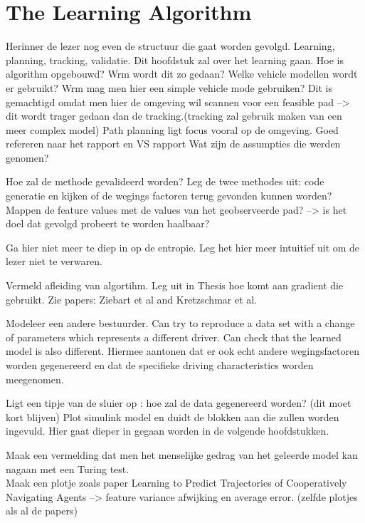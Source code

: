 \chapter{The Learning Algorithm\\}
\label{cha:2}
Herinner de lezer nog even de structuur die gaat worden gevolgd. 
Learning, planning, tracking, validatie.
Dit hoofdstuk zal over het learning gaan.
Hoe is algorithm opgebouwd? Wrm wordt dit zo gedaan?
Welke vehicle modellen wordt er gebruikt? Wrm mag men hier een simple vehicle mode gebruiken?
Dit is gemachtigd omdat men hier de omgeving wil scannen voor een feasible pad --> dit wordt trager gedaan dan de tracking.(tracking zal gebruik maken van een meer complex model) Path planning ligt focus vooral op de omgeving.
Goed refereren naar het rapport en VS rapport
Wat zijn de assumpties die werden genomen?

Hoe zal de methode gevalideerd worden? Leg de twee methodes uit: code generatie en kijken of de wegings factoren terug gevonden kunnen worden? Mappen de feature values met de values van het geobserveerde pad? --> is het doel dat gevolgd probeert te worden haalbaar? 

Ga hier niet meer te diep in op de entropie. Leg het hier meer intuitief uit om de lezer niet te verwaren. 

Vermeld afleiding van algortihm. Leg uit in Thesis hoe komt aan gradient die gebruikt. Zie papers: Ziebart et al and Kretzschmar et al.

Modeleer een andere bestuurder. Can try to reproduce a data set with a change of parameters which represents a different driver. Can check that the learned model is also different. Hiermee aantonen dat er ook echt andere wegingsfactoren worden gegenereerd en dat de specifieke driving characteristics worden meegenomen.

Ligt een tipje van de sluier op : hoe zal de data gegenereerd worden? (dit moet kort blijven)
Plot simulink model en duidt de blokken aan die zullen worden ingevuld. Hier gaat dieper in gegaan worden in de volgende hoofdstukken. 

Maak een vermelding dat men het menselijke gedrag van het geleerde model kan nagaan met een Turing test.\\

Maak een plotje zoals paper Learning to Predict Trajectories of Cooperatively Navigating Agents --> feature variance afwijking en average error. (zelfde plotjes als al de papers)\\



